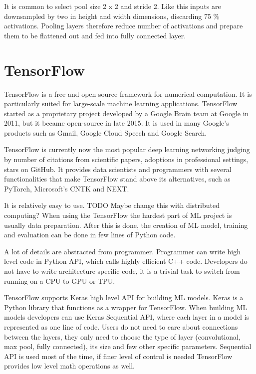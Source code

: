 It is common to select pool size 2 x 2 and stride 2.
Like this inputs are downsampled by two in height and width dimensions, discarding 75 \% activations.
Pooling layers therefore reduce number of activations and prepare them to be flattened out and fed into fully connected layer.

\section{ TensorFlow}

TensorFlow is a free and open-source framework for numerical computation.
It is particularly suited for large-scale machine learning applications\cite{geron}.
TensorFlow started as a proprietary project developed by a Google Brain team at Google in 2011, but it became open-source in late 2015.
It is used in many Google's products such as Gmail, Google Cloud Speech and Google Search.

TensorFlow is currently now the most popular deep learning networking judging by number of citations from scientific papers, adoptions in professional settings, stars on GitHub.
It provides data scientists and programmers with several functionalities that make TensorFlow stand above its alternatives, such as PyTorch, Microsoft's CNTK and NEXT.

It is relatively easy to use. TODO Maybe change this with distributed computing?
When using the TensorFlow the hardest part of ML project is usually data preparation.
After this is done, the creation of ML model, training and evaluation can be done in few lines of Python code.

A lot of details are abstracted from programmer.
Programmer can write high level code in Python API, which calls highly efficient C++ code.
Developers do not have to write architecture specific code, it is a trivial task to switch from running on a CPU to GPU or TPU.

TensorFlow supports Keras high level API for building ML models. 
Keras is a Python library that functions as a wrapper for TensorFlow.
When building ML models developers can use Keras Sequential API, where each layer in a model is represented as one line of code.
Users do not need to care about connections between the layers, they only need to choose the type of layer (convolutional, max pool, fully connected), its size and few other specific parameters.
Sequential API is used most of the time, if finer level of control is needed TensorFlow provides low level math operations as well.

